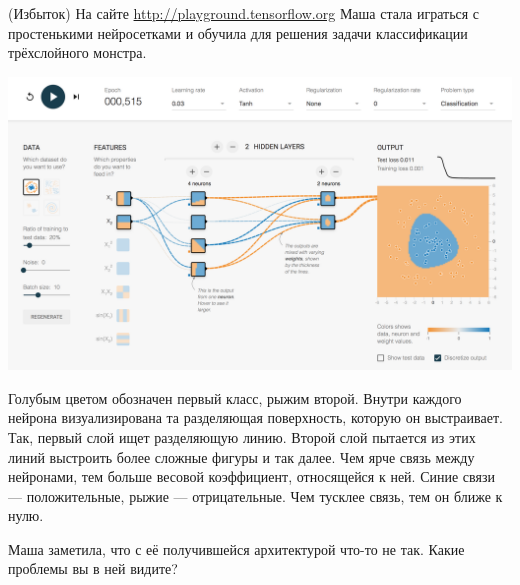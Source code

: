 \documentclass[12pt, a4paper, oneside]{article}
\theoremstyle{plain} %
\theoremstyle{definition}
\begin{document}
\begin{problem}{(Избыток)}
На сайте \url{http://playground.tensorflow.org} Маша стала играться с простенькими нейросетками и  обучила для решения задачи классификации трёхслойного монстра.

\begin{center} 
\includegraphics[scale=0.17]{tensorflow_demo.png}
\end{center} 

Голубым цветом обозначен первый класс, рыжим второй. Внутри каждого нейрона визуализирована та разделяющая поверхность, которую он выстраивает. Так, первый слой ищет разделяющую линию. Второй слой пытается из этих линий выстроить более сложные фигуры и так далее. Чем ярче связь между нейронами, тем больше весовой коэффициент, относящейся к ней. Синие связи --- положительные, рыжие --- отрицательные. Чем тусклее связь, тем он ближе к нулю. 

Маша заметила, что с её получившейся архитектурой что-то не так. Какие проблемы вы в ней видите?
\end{problem} 
\end{document}
